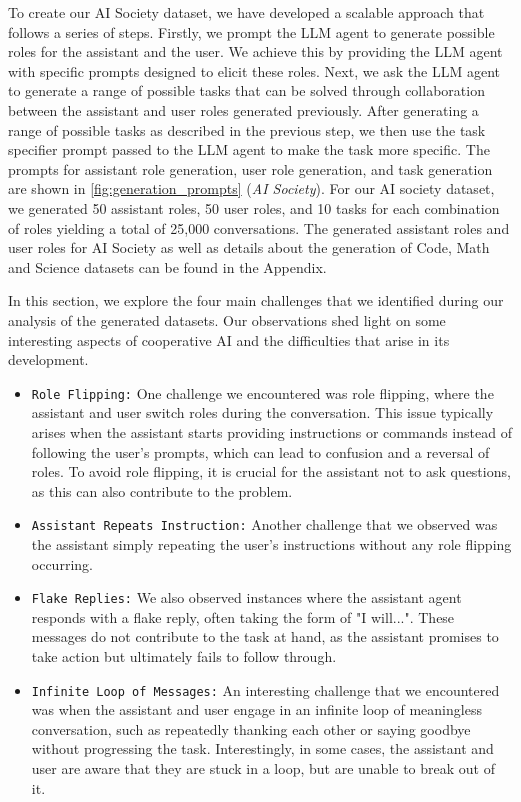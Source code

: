 To create our AI Society dataset, we have developed a scalable approach that follows a series of steps. Firstly, we prompt the LLM agent to generate possible roles for the assistant and the user. We achieve this by providing the LLM agent with specific prompts designed to elicit these roles. Next, we ask the LLM agent to generate a range of possible tasks that can be solved through collaboration between the assistant and user roles generated previously. After generating a range of possible tasks as described in the previous step, we then use the task specifier prompt passed to the LLM agent to make the task more specific. The prompts for assistant role generation, user role generation, and task generation are shown in \figLabel \ref{fig:generation_prompts} (\textit{AI Society}). For our AI society dataset, we generated 50 assistant roles, 50 user roles, and 10 tasks for each combination of roles yielding a total of 25,000 conversations. 
The generated assistant roles and user roles for AI Society as well as details about the generation of Code, Math and Science datasets can be found in the Appendix.



 In this section, we explore the four main challenges that we identified during our analysis of the generated datasets. Our observations shed light on some interesting aspects of cooperative AI and the difficulties that arise in its development.


\begin{itemize}[leftmargin=0.5cm]
\item \texttt{Role Flipping:} One challenge we encountered was role flipping, where the assistant and user switch roles during the conversation. This issue typically arises when the assistant starts providing instructions or commands instead of following the user's prompts, which can lead to confusion and a reversal of roles. To avoid role flipping, it is crucial for the assistant not to ask questions, as this can also contribute to the problem.

\item \texttt{Assistant Repeats Instruction:} Another challenge that we observed was the assistant simply repeating the user's instructions without any role flipping occurring.

\item \texttt{Flake Replies:} We also observed instances where the assistant agent responds with a flake reply, often taking the form of "I will...". These messages do not contribute to the task at hand, as the assistant promises to take action but ultimately fails to follow through.

\item \texttt{Infinite Loop of Messages:} An interesting challenge that we encountered was when the assistant and user engage in an infinite loop of meaningless conversation, such as repeatedly thanking each other or saying goodbye without progressing the task. Interestingly, in some cases, the assistant and user are aware that they are stuck in a loop, but are unable to break out of it.

\end{itemize}

